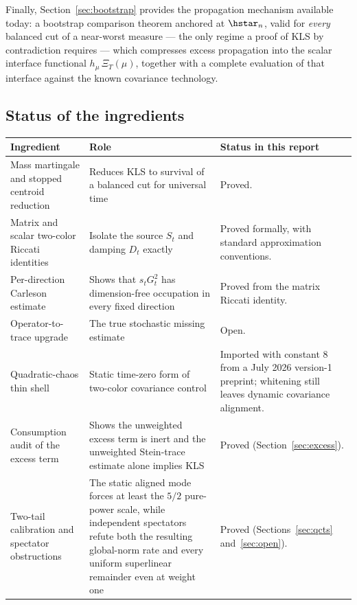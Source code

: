 \documentclass[../../main.tex]{subfiles}
\begin{document}
Finally, Section~\ref{sec:bootstrap} provides the propagation mechanism available today: a
bootstrap comparison theorem anchored at $\hstar_n$, valid for \emph{every} balanced cut of a
near-worst measure --- the only regime a proof of KLS by contradiction requires --- which
compresses excess propagation into the scalar interface functional $h_\mu\,\Xi_T(\mu)$, together
with a complete evaluation of that interface against the known covariance technology.

\subsection{Status of the ingredients}

\begin{center}
\begin{tabularx}{\textwidth}{@{}>{\raggedright\arraybackslash}p{}>{\raggedright\arraybackslash}p{}Y@{}}
\toprule
Ingredient & Role & Status in this report \\
\midrule
Mass martingale and stopped centroid reduction & Reduces KLS to survival of a balanced cut for universal time & Proved. \\
\addlinespace
Matrix and scalar two-color Riccati identities & Isolate the source $S_t$ and damping $D_t$ exactly & Proved formally, with standard approximation conventions. \\
\addlinespace
Per-direction Carleson estimate & Shows that $s_tG_t^2$ has dimension-free occupation in every fixed direction & Proved from the matrix Riccati identity. \\
\addlinespace
Operator-to-trace upgrade & The true stochastic missing estimate & Open. \\
\addlinespace
Quadratic-chaos thin shell & Static time-zero form of two-color covariance control & Imported with constant $8$ from a July 2026 version-1 preprint; whitening still leaves dynamic covariance alignment. \\
\addlinespace
Consumption audit of the excess term & Shows the unweighted excess term is inert and the unweighted Stein-trace estimate alone implies KLS & Proved (Section~\ref{sec:excess}). \\
\addlinespace
Two-tail calibration and spectator obstructions & The static aligned mode forces at least the
$5/2$ pure-power scale, while independent spectators refute both the resulting global-norm rate
and every uniform superlinear remainder even at weight one & Proved
(Sections~\ref{sec:qcts} and~\ref{sec:open}). \\
\bottomrule
\end{tabularx}
\end{center}
\end{document}
